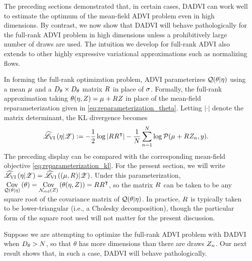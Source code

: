 The preceding sections demonstrated that, in certain cases, DADVI can work well
to estimate the optimum of the mean-field ADVI problem even in high dimensions.
By contrast, we now show that DADVI will behave pathologically for the full-rank
ADVI problem in high dimensions unless a prohibitively large number of draws are
used. The intuition we develop for full-rank ADVI also extends to other highly
expressive variational approximations such as normalizing flows.

In forming the full-rank optimization problem, ADVI parameterizes $\mathcal{Q}(\theta |
\eta)$ using a mean $\mu_{}$ and a $D_{\theta} \times D_{\theta}$ matrix ${R_{}}$
in place of $\sigma_{}$.  Formally, the full-rank approximation taking
$\theta(\eta, Z) = \mu_{} + {R_{}} Z$ in place of the mean-field
reparameterization given in \cref{eq:reparameterization_theta}. Letting
$|\cdot|$ denote the matrix determinant, the KL divergence becomes
%
\begin{align}\label{eq:reparameterization_fr_kl}
    \widehat{\mathscr{L}}_{\mathrm{VI}}\left(\eta | \mathscr{Z}\right) := -\frac{1}{2} \log |{R_{}} {R_{}}^\intercal| -
        \frac{1}{N}\sum_{n=1}^{N} \log \mathcal{P}(\mu_{} + {R_{}} Z_n, y).
\end{align}
%
The preceding display can be compared with the corresponding mean-field
objective \cref{eq:reparameterization_kl}.
%
For the present section, we will
write $\widehat{\mathscr{L}}_{\mathrm{VI}}\left(\eta | \mathscr{Z}\right) = \widehat{\mathscr{L}}_{\mathrm{VI}}\left((\mu, {R_{}}) | \mathscr{Z}\right)$.  Under this
parameterization, $\underset{\mathcal{Q}(\theta \vert \eta )}{\mathrm{Cov}}\left(\theta\right) =
\underset{\mathcal{N}_{\mathrm{std}}\left(Z\right)}{\mathrm{Cov}}\left(\theta(\eta, Z)\right) = {R_{}} {R_{}}^\intercal$, so the matrix ${R_{}}$ can
be taken to be any square root of the covariance matrix of $\mathcal{Q}(\theta \vert
\eta)$.  In practice, ${R_{}}$ is typically taken to be lower-triangular (i.e., a
Cholesky decomposition), though the particular form of the square root used will
not matter for the present discussion.

Suppose we are attempting to optimize the full-rank ADVI problem with DADVI when
$D_{\theta} > N$, so that $\theta$ has more dimensions than there are draws
$Z_n$.  Our next result shows that, in such a case, DADVI will behave
pathologically.

